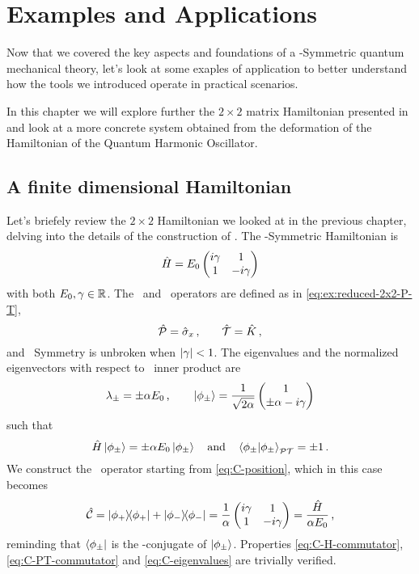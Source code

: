 \chapter{Examples and Applications}\label{ch:examples}
    Now that we covered the key aspects and foundations of a \PT-Symmetric quantum mechanical theory, let's look at some exaples of application to better understand how the tools we introduced operate in practical scenarios.
    
    In this chapter we will explore further the $2\times2$ matrix Hamiltonian presented in  and look at a more concrete system obtained from the deformation of the Hamiltonian of the Quantum Harmonic Oscillator.
    \section{A finite dimensional Hamiltonian}
        Let's briefely review the $2\times2$ Hamiltonian we looked at in the previous chapter, delving into the details of the construction of \hC. The \PT-Symmetric Hamiltonian is
        \begin{equation}
            \hH = E_0 \pmqty{\dmat[1]{i\gamma, -i\gamma}}
        \end{equation}
        with both $E_0,\gamma \in \mathbb{R}$. The \hP\ and \hT\ operators are defined as in \eqref{eq:ex:reduced-2x2-P-T},
        \begin{equation*}
            \mathcal{\hat{P}} = \hat{\sigma}_x \,\text{,} \qquad \mathcal{\hat{T}} = \hat{K}
            \,\text{,}
        \end{equation*}
        and \PT\ Symmetry is unbroken when $\abs{\gamma} < 1$. The eigenvalues and the normalized eigenvectors with respect to \PT\ inner product are
        \begin{equation*}
            \lambda_\pm = \pm \alpha E_0
            \mycomma
            \qquad
            \ket{\phi_\pm} = \frac{1}{\sqrt{2\alpha}} \pmqty{1 \\ \pm\alpha - i \gamma}
        \end{equation*}
        such that
        \begin{equation*}
            \hH\ket{\phi_\pm} = \pm \alpha E_0 \ket{\phi_\pm}
            \qand
            \braket{\phi_\pm}{\phi_\pm}_{\PT} = \pm 1
            \myperiod
        \end{equation*}
        We construct the \hC\ operator starting from \eqref{eq:C-position}, which in this case becomes
        \begin{equation}
            \hC = \dyad{\phi_+}{\phi_+} + \dyad{\phi_-}{\phi_-} = \frac{1}{\alpha}\pmqty{\dmat[1]{i\gamma, -i\gamma}} = \frac{\hH}{\alpha E_0}
            \mycomma
        \end{equation}
        reminding that $\bra{\phi_\pm}$ is the \PT-conjugate of $\ket{\phi_\pm}$. Properties \eqref{eq:C-H-commutator}, \eqref{eq:C-PT-commutator} and \eqref{eq:C-eigenvalues} are trivially verified.

